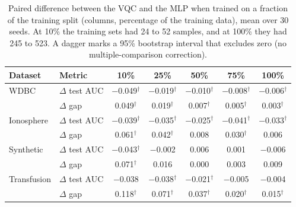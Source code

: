 \begin{table}[t]
\centering
\caption{Paired difference between the VQC and the MLP when trained on a fraction of the training split (columns, percentage of the training data), mean over 30 seeds. At 10\% the training sets had 24 to 52 samples, and at 100\% they had 245 to 523. A dagger marks a 95\% bootstrap interval that excludes zero (no multiple-comparison correction).}
\label{tab:h4}
\footnotesize
\setlength{\tabcolsep}{3pt}
\begin{tabular}{llccccc}
\hline
Dataset & Metric & 10\% & 25\% & 50\% & 75\% & 100\% \\
\hline
WDBC & $\Delta$ test AUC & $-$0.049$^{\dagger}$ & $-$0.019$^{\dagger}$ & $-$0.010$^{\dagger}$ & $-$0.008$^{\dagger}$ & $-$0.006$^{\dagger}$ \\
 & $\Delta$ gap & 0.049$^{\dagger}$ & 0.019$^{\dagger}$ & 0.007$^{\dagger}$ & 0.005$^{\dagger}$ & 0.003$^{\dagger}$ \\
Ionosphere & $\Delta$ test AUC & $-$0.039$^{\dagger}$ & $-$0.035$^{\dagger}$ & $-$0.025$^{\dagger}$ & $-$0.041$^{\dagger}$ & $-$0.033$^{\dagger}$ \\
 & $\Delta$ gap & 0.061$^{\dagger}$ & 0.042$^{\dagger}$ & 0.008 & 0.030$^{\dagger}$ & 0.006 \\
Synthetic & $\Delta$ test AUC & $-$0.043$^{\dagger}$ & $-$0.002 & 0.006 & 0.001 & $-$0.006 \\
 & $\Delta$ gap & 0.071$^{\dagger}$ & 0.016 & 0.000 & 0.003 & 0.009 \\
Transfusion & $\Delta$ test AUC & $-$0.038 & $-$0.038$^{\dagger}$ & $-$0.021$^{\dagger}$ & $-$0.005 & $-$0.004 \\
 & $\Delta$ gap & 0.118$^{\dagger}$ & 0.071$^{\dagger}$ & 0.037$^{\dagger}$ & 0.020$^{\dagger}$ & 0.015$^{\dagger}$ \\
\hline
\end{tabular}
\end{table}
